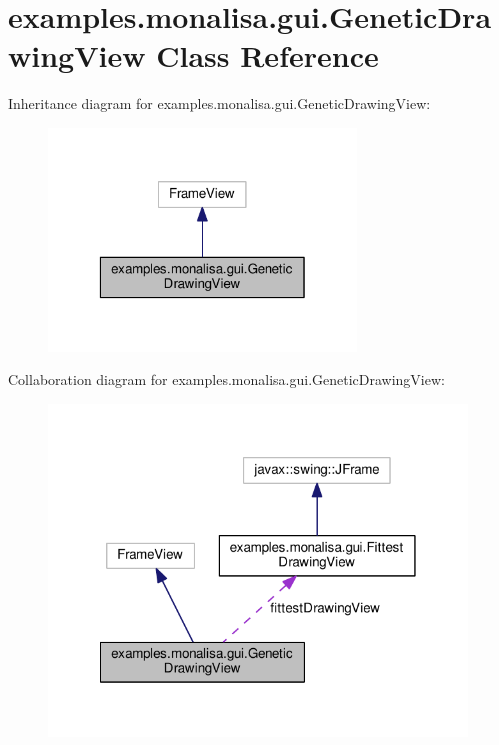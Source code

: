 \hypertarget{classexamples_1_1monalisa_1_1gui_1_1_genetic_drawing_view}{\section{examples.\-monalisa.\-gui.\-Genetic\-Drawing\-View Class Reference}
\label{classexamples_1_1monalisa_1_1gui_1_1_genetic_drawing_view}
}


Inheritance diagram for examples.\-monalisa.\-gui.\-Genetic\-Drawing\-View\-:
\nopagebreak
\begin{figure}[H]
\begin{center}
\leavevmode
\includegraphics[width=232pt]{classexamples_1_1monalisa_1_1gui_1_1_genetic_drawing_view__inherit__graph}
\end{center}
\end{figure}


Collaboration diagram for examples.\-monalisa.\-gui.\-Genetic\-Drawing\-View\-:
\nopagebreak
\begin{figure}[H]
\begin{center}
\leavevmode
\includegraphics[width=315pt]{classexamples_1_1monalisa_1_1gui_1_1_genetic_drawing_view__coll__graph}
\end{center}
\end{figure}
